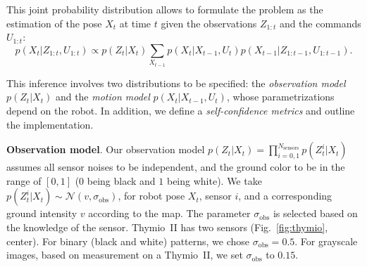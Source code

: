 \documentclass{svmult}
\newcommand{\fig}[1]{Fig.~\ref{fig:#1}}
\begin{document}
This joint probability distribution allows to formulate the problem as the estimation of the pose $X_t$ at time $t$ given the observations $Z_{1:t}$ and the commands $U_{1:t}$:
\begin{equation}
p(X_t|Z_{1:t},U_{1:t}) \propto p(Z_t | X_t) \sum_{X_{t-1}} p(X_t|X_{t-1}, U_t) p(X_{t-1} | Z_{1:t-1}, U_{1:t-1}).
\end{equation}

This inference involves two distributions to be specified: the \emph{observation model} $p(Z_t | X_t)$ and the \emph{motion model} $p(X_t|X_{t-1}, U_t)$, whose parametrizations depend on the robot.
In addition, we define a \emph{self-confidence metrics} and outline the implementation.


\textbf{Observation model}.
Our observation model $p(Z_t | X_t) = \prod_{i=0,1}^{N_\mathrm{sensors}} p(Z_t^{i} | X_t)$ assumes all sensor noises to be independent, and the ground color to be in the range of $[0,1]$ ($0$ being black and $1$ being white).
We take $p(Z_t^{i} | X_t) \sim \mathcal{N}(v,\sigma_\mathrm{obs})$, for robot pose $X_t$, sensor $i$, and a corresponding ground intensity $v$ according to the map.
The parameter $\sigma_\mathrm{obs}$ is selected based on the knowledge of the sensor.
Thymio~II has two sensors (\fig{thymio}, center).
For binary (black and white) patterns, we chose $\sigma_\mathrm{obs} = 0.5$.
For grayscale images, based on measurement on a Thymio~II, we set $\sigma_\mathrm{obs}$ to $0.15$.
\end{document}
